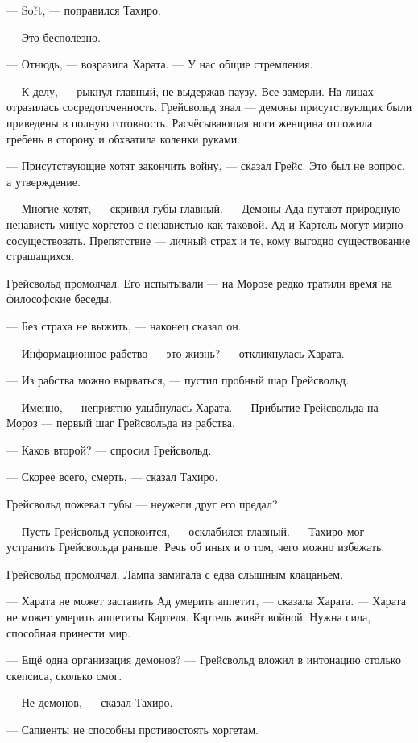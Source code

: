 --- So\v{r}t\FM, --- поправился Тахиро.

--- Это бесполезно.

--- Отнюдь, --- возразила Харата.
--- У нас общие стремления.

--- К делу, --- рыкнул главный, не выдержав паузу.
Все замерли.
На лицах отразилась сосредоточенность.
Грейсвольд знал --- демоны присутствующих были приведены в полную готовность.
Расчёсывающая ноги женщина отложила гребень в сторону и обхватила коленки руками.

--- Присутствующие хотят закончить войну, --- сказал Грейс.
Это был не вопрос, а утверждение.

--- Многие хотят, --- скривил губы главный.
--- Демоны Ада путают природную ненависть минус-хоргетов с ненавистью как таковой.
Ад и Картель могут мирно сосуществовать.
Препятствие --- личный страх и те, кому выгодно существование страшащихся.

Грейсвольд промолчал.
Его испытывали --- на Морозе редко тратили время на философские беседы.

--- Без страха не выжить, --- наконец сказал он.

--- Информационное рабство --- это жизнь? --- откликнулась Харата.

--- Из рабства можно вырваться, --- пустил пробный шар Грейсвольд.

--- Именно, --- неприятно улыбнулась Харата.
--- Прибытие Грейсвольда на Мороз --- первый шаг Грейсвольда из рабства.

--- Каков второй? --- спросил Грейсвольд.

--- Скорее всего, смерть, --- сказал Тахиро.

Грейсвольд пожевал губы --- неужели друг его предал?

--- Пусть Грейсвольд успокоится, --- осклабился главный.
--- Тахиро мог устранить Грейсвольда раньше.
Речь об иных и о том, чего можно избежать.

Грейсвольд промолчал.
Лампа замигала с едва слышным клацаньем.

--- Харата не может заставить Ад умерить аппетит, --- сказала Харата.
--- Харата не может умерить аппетиты Картеля.
Картель живёт войной.
Нужна сила, способная принести мир.

--- Ещё одна организация демонов? --- Грейсвольд вложил в интонацию столько скепсиса, сколько смог.

--- Не демонов, --- сказал Тахиро.

--- Сапиенты не способны противостоять хоргетам.

